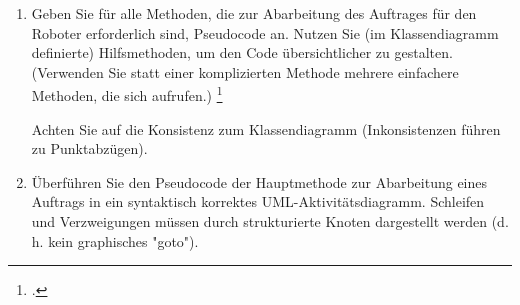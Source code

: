 \documentclass{lehramt-informatik-aufgabe}
\begin{document}

\begin{enumerate}


\item Geben Sie für alle Methoden, die zur Abarbeitung des Auftrages für
den Roboter erforderlich sind, Pseudocode an. Nutzen Sie (im
Klassendiagramm definierte) Hilfsmethoden, um den Code übersichtlicher
zu gestalten. (Verwenden Sie statt einer komplizierten Methode mehrere
einfachere Methoden, die sich aufrufen.)
\footcite{examen:66116:2019:03}

Achten Sie auf die Konsistenz zum Klassendiagramm (Inkonsistenzen führen
zu Punktabzügen).


\item Überführen Sie den Pseudocode der Hauptmethode zur Abarbeitung
eines Auftrags in ein syntaktisch korrektes UML-Aktivitätsdiagramm.
Schleifen und Verzweigungen müssen durch strukturierte Knoten
dargestellt werden (d. h. kein graphisches "goto").

\end{enumerate}
\end{document}
